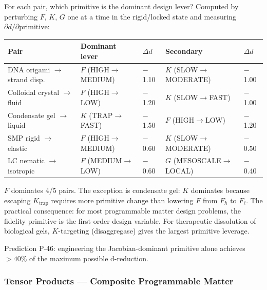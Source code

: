 \documentclass[12pt,a4paper]{article}
\begin{document}
For each pair, which primitive is the dominant design lever? Computed by perturbing $F$, $K$, $G$ one at a time in the rigid/locked state and measuring $\partial d / \partial \text{primitive}$:

\begin{table}[htbp]
\centering
\small
{}
\begin{tabularx}{\textwidth}{>{\centering\arraybackslash}X >{\centering\arraybackslash}X >{\centering\arraybackslash}X >{\centering\arraybackslash}X >{\centering\arraybackslash}X}
\toprule
\rowcolor{gray!25}\textbf{Pair} & \textbf{Dominant lever} & \textbf{$\Delta d$} & \textbf{Secondary} & \textbf{$\Delta d$} \\
\midrule
\rowcolors{1}{white}{gray!10}
DNA origami $\rightarrow$ strand disp. & $F$ (HIGH$\rightarrow$MEDIUM) & $-$1.10 & $K$ (SLOW$\rightarrow$MODERATE) & $-$1.00 \\
Colloidal crystal $\rightarrow$ fluid & $F$ (HIGH$\rightarrow$LOW) & $-$1.20 & $K$ (SLOW$\rightarrow$FAST) & $-$1.00 \\
Condensate gel $\rightarrow$ liquid & $K$ (TRAP$\rightarrow$FAST) & $-$1.50 & $F$ (HIGH$\rightarrow$LOW) & $-$1.20 \\
SMP rigid $\rightarrow$ elastic & $F$ (HIGH$\rightarrow$MEDIUM) & $-$0.60 & $K$ (SLOW$\rightarrow$MODERATE) & $-$0.50 \\
LC nematic $\rightarrow$ isotropic & $F$ (MEDIUM$\rightarrow$LOW) & $-$0.60 & $G$ (MESOSCALE$\rightarrow$LOCAL) & $-$0.40 \\
\bottomrule
\end{tabularx}
\end{table}

$F$ dominates 4/5 pairs. The exception is condensate gel: $K$ dominates because escaping $K_\text{trap}$ requires more primitive change than lowering $F$ from $F_\hbar$ to $F_\ell$. The practical consequence: for most programmable matter design problems, the fidelity primitive is the first-order design variable. For therapeutic dissolution of biological gels, $K$-targeting (disaggregase) gives the largest primitive leverage.

Prediction P-46: engineering the Jacobian-dominant primitive alone achieves $> 40\%$ of the maximum possible d-reduction.

\subsubsection{Tensor Products --- Composite Programmable Matter}
\end{document}
